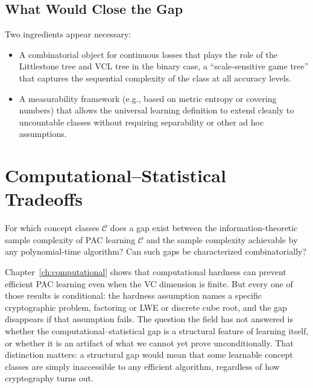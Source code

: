 \subsection{What Would Close the Gap}

Two ingredients appear necessary:
\begin{itemize}[leftmargin=*]
\item A combinatorial object for continuous losses that plays the role of
  the Littlestone tree and VCL tree in the binary case, a ``scale-sensitive
  game tree'' that captures the sequential complexity of the class at all
  accuracy levels.
\item A measurability framework (e.g., based on metric entropy or covering
  numbers) that allows the universal learning definition to extend cleanly
  to uncountable classes without requiring separability or other ad hoc
  assumptions.
\end{itemize}



\section{Computational--Statistical Tradeoffs}
\label{sec:comp-stat-tradeoffs}

\begin{openprob}
\label{op:comp-stat}
For which concept classes $\mathcal{C}$ does a gap exist between the
information-theoretic sample complexity of PAC learning $\mathcal{C}$ and
the sample complexity achievable by any polynomial-time algorithm?
Can such gaps be characterized combinatorially?
\end{openprob}

Chapter~\ref{ch:computational} shows that computational hardness can prevent efficient PAC learning even when the VC dimension is finite.  But every one of those results is conditional: the hardness assumption names a specific cryptographic problem, factoring or LWE or discrete cube root, and the gap disappears if that assumption fails.  The question the field has not answered is whether the computational--statistical gap is a structural feature of learning itself, or whether it is an artifact of what we cannot yet prove unconditionally.  That distinction matters: a structural gap would mean that some learnable concept classes are simply inaccessible to any efficient algorithm, regardless of how cryptography turns out.

